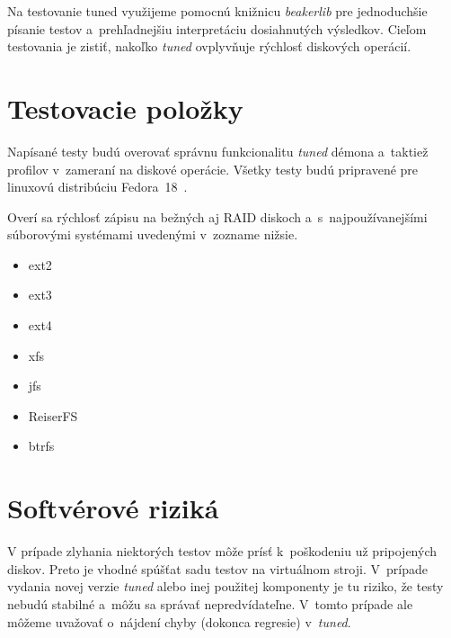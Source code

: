 Na testovanie tuned využijeme pomocnú knižnicu \emph{beakerlib}
\cite{beakerlibHomepage} pre jednoduchšie písanie testov a~prehľadnejšiu
interpretáciu dosiahnutých výsledkov. Cieľom testovania je zistiť, nakoľko
\emph{tuned} ovplyvňuje rýchlosť diskových operácií.

\section{Testovacie položky}

Napísané testy budú overovať správnu funkcionalitu \emph{tuned} démona a~taktiež
profilov v~zameraní na diskové operácie. Všetky testy budú
pripravené pre linuxovú distribúciu Fedora~18~\cite{fedoraHomepage}.

Overí sa rýchlosť zápisu na bežných aj RAID diskoch a~s~najpoužívanejšími
súborovými systémami uvedenými v~zozname nižsie.

\begin{itemize}
    \item ext2
    \item ext3
    \item ext4
    \item xfs
    \item jfs
    \item ReiserFS
    \item btrfs
\end{itemize}


\section{Softvérové riziká}
\label{sec:softverove-rizika}

V prípade zlyhania niektorých testov môže prísť k~poškodeniu už pripojených
diskov. Preto je vhodné spúšťat sadu testov na virtuálnom stroji. V~prípade
vydania novej verzie \emph{tuned} alebo inej použitej komponenty je tu riziko,
že testy nebudú stabilné a~môžu sa správať nepredvídateľne. V~tomto prípade ale
môžeme uvažovať o~nájdení chyby (dokonca regresie) v~\emph{tuned}.

